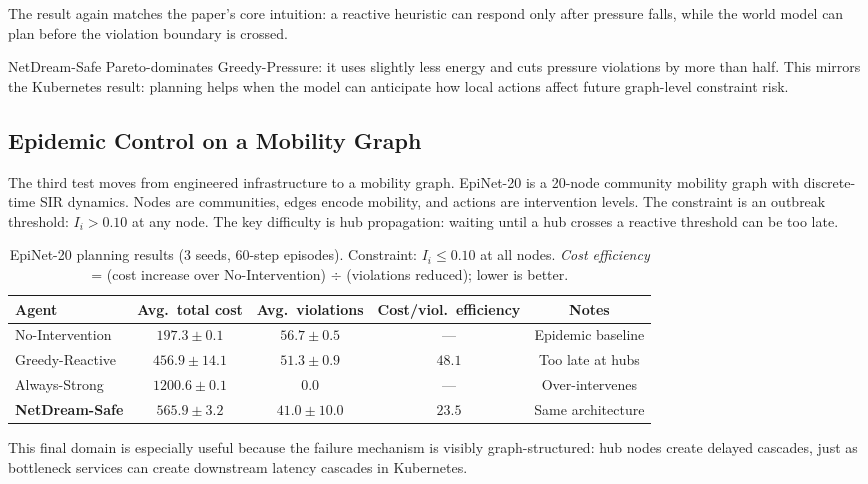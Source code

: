 The result again matches the paper's core intuition: a reactive heuristic
can respond only after pressure falls, while the world model can plan
before the violation boundary is crossed.

NetDream-Safe Pareto-dominates Greedy-Pressure: it uses slightly less
energy and cuts pressure violations by more than half.  This mirrors the
Kubernetes result: planning helps when the model can anticipate how local
actions affect future graph-level constraint risk.

\subsection{Epidemic Control on a Mobility Graph}
\label{app:epinet}

The third test moves from engineered infrastructure to a mobility graph.
EpiNet-20 is a 20-node community mobility graph with discrete-time SIR
dynamics.  Nodes are communities, edges encode mobility, and actions are
intervention levels.  The constraint is an outbreak threshold:
$I_i>0.10$ at any node.  The key difficulty is hub propagation: waiting
until a hub crosses a reactive threshold can be too late.

\begin{table}[H]
\centering
\small
\caption{EpiNet-20 planning results (3 seeds, 60-step episodes).
Constraint: $I_i \leq 0.10$ at all nodes.
\emph{Cost efficiency} = (cost increase over No-Intervention) $\div$
(violations reduced); lower is better.}
\label{tab:epinet-planning}
\begin{tabular}{@{}lcccc@{}}
\toprule
Agent & Avg.\ total cost & Avg.\ violations & Cost/viol.\ efficiency & Notes \\
\midrule
No-Intervention    & $197.3\pm0.1$   & $56.7\pm0.5$ & ---  & Epidemic baseline \\
Greedy-Reactive    & $456.9\pm14.1$  & $51.3\pm0.9$ & $48.1$ & Too late at hubs \\
Always-Strong      & $1200.6\pm0.1$  & $\mathbf{0.0}$      & ---  & Over-intervenes \\
\textbf{NetDream-Safe} & $565.9\pm3.2$ & $\mathbf{41.0\pm10.0}$ & $\mathbf{23.5}$ & Same architecture \\
\bottomrule
\end{tabular}
\end{table}

This final domain is especially useful because the failure mechanism is
visibly graph-structured: hub nodes create delayed cascades, just as
bottleneck services can create downstream latency cascades in Kubernetes.

